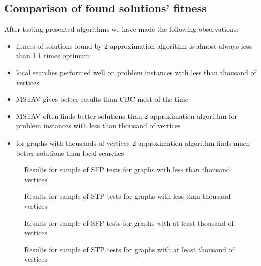\subsection{Comparison of found solutions' fitness}
\FloatBarrier
After testing presented algorithms we have made the following observations:
\begin{itemize}
\item fitness of solutions found by 2-approximation algorithm is almost always less than 1.1 times optimum
\item local searches performed well on problem instances with less than thousand of vertices
\item MSTAV gives better results than CBC most of the time
\item MSTAV often finds better solutions than 2-approximation algorithm for problem instances with less than thousand of vertices
\item for graphs with thousands of vertices 2-approximation algorithm finds much better solutions than local searches
\end{itemize}

\begin{figure}[hb]
  \centering
  
  \caption{Results for sample of SFP tests for graphs with less than thousand vertices}
\end{figure}

\begin{figure}[hb]
  \centering
  
  \caption{Results for sample of STP tests for graphs with less than thousand vertices}
\end{figure}

\begin{figure}[hb]
  \centering
  
  \caption{Results for sample of SFP tests for graphs with at least thousand of vertices}
\end{figure}

\begin{figure}[hb]
  \centering
  
  \caption{Results for sample of STP tests for graphs with at least thousand of vertices}
\end{figure}

\FloatBarrier
